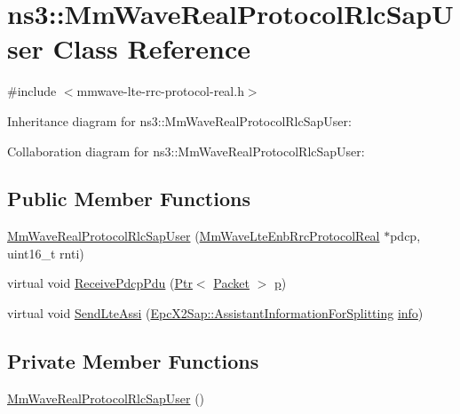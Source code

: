 \hypertarget{classns3_1_1MmWaveRealProtocolRlcSapUser}{}\section{ns3\+:\+:Mm\+Wave\+Real\+Protocol\+Rlc\+Sap\+User Class Reference}
\label{classns3_1_1MmWaveRealProtocolRlcSapUser}


{\ttfamily \#include $<$mmwave-\/lte-\/rrc-\/protocol-\/real.\+h$>$}



Inheritance diagram for ns3\+:\+:Mm\+Wave\+Real\+Protocol\+Rlc\+Sap\+User\+:


Collaboration diagram for ns3\+:\+:Mm\+Wave\+Real\+Protocol\+Rlc\+Sap\+User\+:
\subsection*{Public Member Functions}
\begin{DoxyCompactItemize}
\item 
\hyperlink{classns3_1_1MmWaveRealProtocolRlcSapUser_a868cd86ca2568538c6452567e8905804}{Mm\+Wave\+Real\+Protocol\+Rlc\+Sap\+User} (\hyperlink{classns3_1_1MmWaveLteEnbRrcProtocolReal}{Mm\+Wave\+Lte\+Enb\+Rrc\+Protocol\+Real} $\ast$pdcp, uint16\+\_\+t rnti)
\item 
virtual void \hyperlink{classns3_1_1MmWaveRealProtocolRlcSapUser_a28224406952b1d1cf406ed103b636568}{Receive\+Pdcp\+Pdu} (\hyperlink{classns3_1_1Ptr}{Ptr}$<$ \hyperlink{classns3_1_1Packet}{Packet} $>$ \hyperlink{lte__link__budget__x2__handover__measures_8m_ac9de518908a968428863f829398a4e62}{p})
\item 
virtual void \hyperlink{classns3_1_1MmWaveRealProtocolRlcSapUser_a0bcc3ec114d32f50314dfcc4ac1e8773}{Send\+Lte\+Assi} (\hyperlink{structns3_1_1EpcX2Sap_1_1AssistantInformationForSplitting}{Epc\+X2\+Sap\+::\+Assistant\+Information\+For\+Splitting} \hyperlink{classns3_1_1LteRlcSapUser_ae5c93c1d5c538c4f8cec3ad4ecbd898a}{info})
\end{DoxyCompactItemize}
\subsection*{Private Member Functions}
\begin{DoxyCompactItemize}
\item 
\hyperlink{classns3_1_1MmWaveRealProtocolRlcSapUser_a75e85ac0b73aea7b30c46643c704cb8f}{Mm\+Wave\+Real\+Protocol\+Rlc\+Sap\+User} ()
\end{DoxyCompactItemize}
